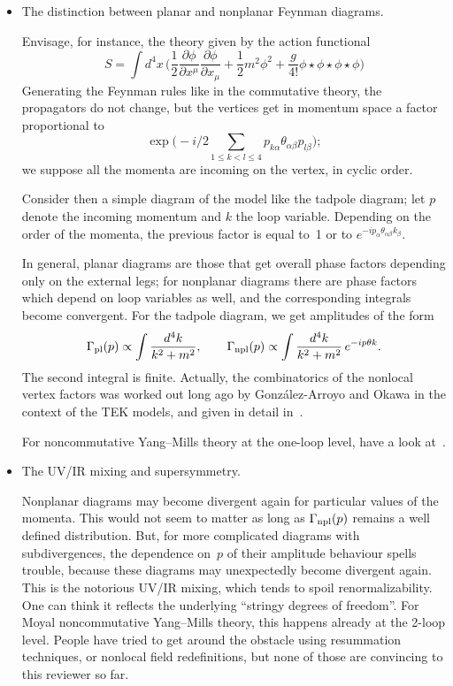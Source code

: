 \documentclass[a4paper,12pt]{article}
\renewcommand{\a}{\alpha}           %
\renewcommand{\b}{\beta}            %
\newcommand{\Ga}{\Gamma}            %
\newcommand{\pd}[2]{\frac{\partial#1}{\partial#2}} %
\newcommand{\1}{\mathbf{1}}         %
\newcommand{\7}{\dagger}            %
\newcommand{\8}{\bullet}            %
\renewcommand{\.}{\cdot}            %
\renewcommand{\:}{\colon}           %
\begin{document}
\begin{itemize}

\item  The distinction between planar and nonplanar Feynman diagrams.

Envisage, for instance, the theory given by the action functional
$$
S = \int d^4x\, \biggl(\frac{1}{2} \pd{\phi}{x^\mu} \pd{\phi}{x_\mu} 
+ \frac{1}{2} m^2\phi^2 + \frac{g}{4!} \phi\star\phi\star\phi\star\phi 
\biggr)
$$
Generating the Feynman rules like in the commutative theory, the
propagators do not change, but the vertices get in momentum space a
factor proportional to
$$
\exp\biggl(-i/2\sum_{1\leq k<l\leq 4}p_{k\a}\theta_{\a\b}p_{l\b}\biggr);
$$
we suppose all the momenta are incoming on the vertex, in cyclic order.

Consider then a simple diagram of the model like the tadpole diagram;
let $p$ denote the incoming momentum and $k$ the loop variable.
Depending on the order of the momenta, the previous factor is equal
to~1 or to $e^{-ip_\a\theta_{\a\b}k_\b}$.

In general, planar diagrams are those that get overall phase factors
depending only on the external legs; for nonplanar diagrams there are
phase factors which depend on loop variables as well, and the
corresponding integrals become convergent. For the tadpole diagram, we
get amplitudes of the form
$$
\Ga_{\rm pl}(p)\propto \int \frac{d^4k}{k^2 + m^2},  \qquad
\Ga_{\rm npl}(p)\propto \int \frac{d^4k}{k^2 + m^2}\, e^{-ip\theta k}.
$$
The second integral is finite. Actually, the combinatorics of the
nonlocal vertex factors was worked out long ago by Gonz\'alez-Arroyo
and Okawa in the context of the TEK models, and given in detail
in~\cite{KorthalsAltes}.

For noncommutative Yang--Mills theory at the one-loop level, have a
look at~\cite{MartinSRtwo}.

\item  The UV/IR mixing and supersymmetry.

Nonplanar diagrams may become divergent again for particular values of
the momenta. This would not seem to matter as long as
$\Ga_{\rm npl}(p)$ remains a well defined distribution. But, for more
complicated diagrams with subdivergences, the dependence on~$p$ of
their amplitude behaviour spells trouble, because these diagrams may
unexpectedly become divergent again. This is the notorious UV/IR
mixing, which tends to spoil renormalizability. One can think it
reflects the underlying ``stringy degrees of freedom''. For Moyal
noncommutative Yang--Mills theory, this happens already at the 2-loop
level. People have tried to get around the obstacle using resummation
techniques, or nonlocal field redefinitions, but none of those are
convincing to this reviewer so far.


\end{itemize}
\end{document}
